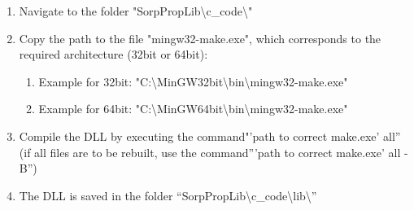 \begin{enumerate}
\begin{enumerate}
		\item Navigate to the folder "SorpPropLib\textbackslash c\_code\textbackslash"
		\item Copy the path to the file "mingw32-make.exe", which corresponds to the required architecture (32bit or 64bit):
		\begin{enumerate}
			\item Example for 32bit: "C:\textbackslash MinGW32bit\textbackslash bin\textbackslash mingw32-make.exe"
			\item Example for 64bit: "C:\textbackslash MinGW64bit\textbackslash bin\textbackslash mingw32-make.exe"
		\end{enumerate}
		\item Compile the DLL by executing the command"’path to correct make.exe’ all” (if all files are to be rebuilt, use the command”’path to correct make.exe’ all -B”)
		\item The DLL is saved in the folder “SorpPropLib\textbackslash c\_code\textbackslash lib\textbackslash”
	\end{enumerate}
\end{enumerate}
%
